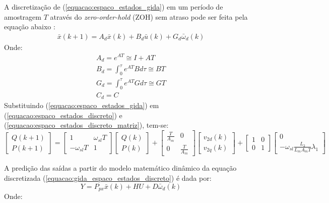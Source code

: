 	A discretização de (\ref{equacao:espaco_estados_gida}) em um período de amostragem $T$ através do \emph{zero-order-hold} (ZOH) sem atraso pode ser feita pela equação abaixo \cite{franklinpowell}:
	\begin{equation}
		\label{equacao:espaco_estados_discreto}
		\begin{split}
			\bar{x}(k+1)=A_d\bar{x}(k)+B_d\bar{u}(k)+G_d\bar{\omega}_d(k)
		\end{split}
	\end{equation}
	Onde:
	\begin{equation}
		\label{equacao:espaco_estados_discreto_matriz}
		\begin{split}
			A_d=e^{AT}\cong I+AT \\
			B_d=\int_0^\tau e^{AT}Bd\tau \cong BT \\
			G_d=\int_0^\tau e^{AT}Gd\tau \cong GT \\
			C_d = C
		\end{split}
	\end{equation}
	Substituindo (\ref{equacao:espaco_estados_gida}) em (\ref{equacao:espaco_estados_discreto}) e (\ref{equacao:espaco_estados_discreto_matriz}), tem-se:
	\begin{equation}
		\label{equacao:gida_espaco_estados_discreto}
		\begin{bmatrix}
			Q(k+1) \\
			P(k+1)
		\end{bmatrix} = 
		\begin{bmatrix}
			1             & \omega_{sl}T \\
			-\omega_{sl}T & 1
		\end{bmatrix}
		\begin{bmatrix}
			Q(k) \\
			P(k)
		\end{bmatrix} + 
		\begin{bmatrix}
			\frac{T}{A_m} & 0 \\
			0 & \frac{T}{A_m}
		\end{bmatrix}
		\begin{bmatrix}
			v_{2d}(k) \\
			v_{2q}(k)
		\end{bmatrix} +
		\begin{bmatrix}
			1 & 0 \\
			0 & 1 
		\end{bmatrix} 
		\begin{bmatrix}
			0 \\
			-\omega_{sl}\frac{L_2}{L_mA_mT}\lambda_1
		\end{bmatrix}
	\end{equation}
	
	A predição das saídas a partir do modelo matemático dinâmico da equação discretizada (\ref{equacao:gida_espaco_estados_discreto}) é dada por:
	\begin{equation}
		\label{equacao:predicao_saidas}
		Y=P_{px}\bar{x}(k)+HU+D\bar{\omega}_d(k)
	\end{equation}
	Onde:
	
	
	
